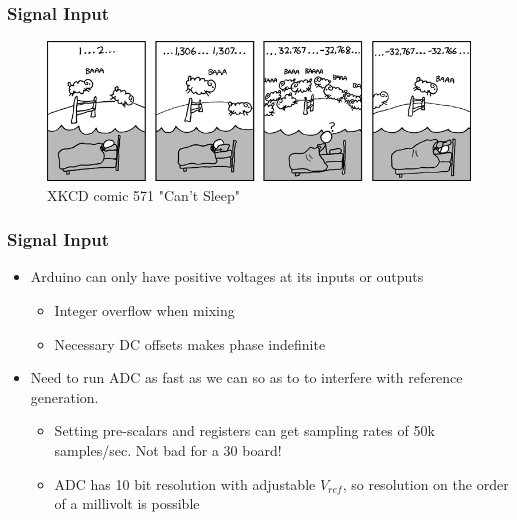 \documentclass{beamer}
\begin{document}
\begin{frame}
\frametitle{Signal Input}
\begin{center}
\begin{figure}
\hspace*{-.45cm}\includegraphics[scale=.5]{cant_sleep.png}\\
XKCD comic 571 "Can't Sleep"
\end{figure}
\end{center}
\end{frame}
\begin{frame}
\frametitle{Signal Input}
\begin{itemize}
	\item {Arduino can only have positive voltages at its inputs or outputs}
		\begin{itemize}
			\item {Integer overflow when mixing}
			\item {Necessary DC offsets makes phase indefinite}
		\end{itemize}
	\item {Need to run ADC as fast as we can so as to to interfere with reference generation.}

		\begin{itemize}
			\item{Setting pre-scalars and registers can get sampling rates of 50k samples/sec. Not bad for  a 30 board!}
			\item{ADC has 10 bit resolution with adjustable $V_{ref}$, so resolution on the order of a millivolt is possible}
		\end{itemize}
\end{itemize}

\end{frame}
\end{document}
